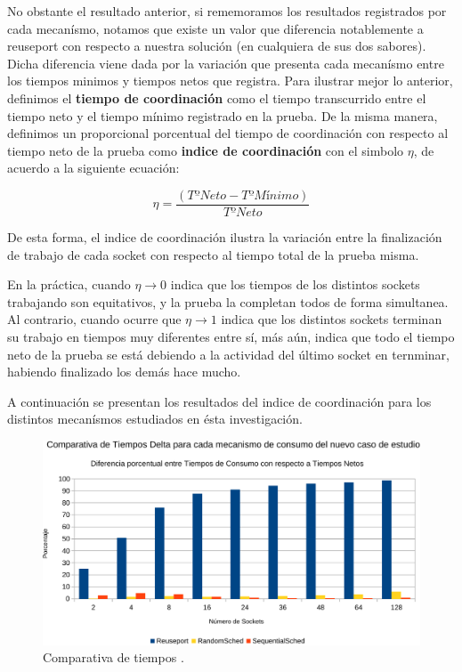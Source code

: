 No obstante el resultado anterior, si rememoramos los resultados registrados por cada mecanísmo, notamos que existe un valor que diferencia notablemente a reuseport con respecto a nuestra solución (en cualquiera de sus dos sabores). Dicha diferencia viene dada por la variación que presenta cada mecanísmo entre los tiempos minimos y tiempos netos que registra. Para ilustrar mejor lo anterior, definimos el \textbf{tiempo de coordinación} como el tiempo transcurrido entre el tiempo neto y el tiempo mínimo registrado en la prueba. De la misma manera, definimos un proporcional porcentual del tiempo de coordinación con respecto al tiempo neto de la prueba como \textbf{indice de coordinación} con el simbolo $\eta$, de acuerdo a la siguiente ecuación:

\begin{equation}
\eta = \frac{\left(Tº Neto - Tº Mínimo\right)}{Tº Neto}
\end{equation}

De esta forma, el indice de coordinación ilustra la variación entre la finalización de trabajo de cada socket con respecto al tiempo total de la prueba misma. 

En la práctica, cuando $\eta\rightarrow 0$ indica que los tiempos de los distintos sockets trabajando son equitativos, y la prueba la completan todos de forma simultanea. Al contrario, cuando ocurre que $\eta \rightarrow 1$ indica que los distintos sockets terminan su trabajo en tiempos muy diferentes entre sí, más aún, indica que todo el tiempo neto de la prueba se está debiendo a la actividad del último socket en ternminar, habiendo finalizado los demás hace mucho.

A continuación se presentan los resultados del indice de coordinación para los distintos mecanísmos estudiados en ésta investigación.

\begin{figure}[!h]
	\centering
	\includegraphics[scale=.6]{resultados/tiempodelta-crop.pdf}
	\caption{Comparativa de tiempos .}
	\label{fig:tiemposdelta}
\end{figure}


